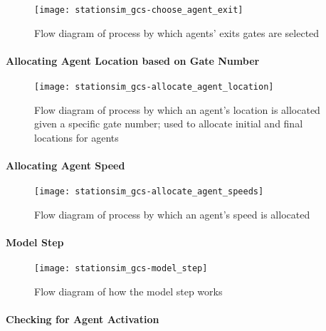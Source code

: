 \begin{figure}[h]
    \centering
    \texttt{[image: stationsim\_gcs-choose\_agent\_exit]}
    \caption{Flow diagram of process by which agents' exits gates are
    selected}\label{fig:flow:agent_exit}
\end{figure}

\paragraph{Allocating Agent Location based on Gate
Number}\label{para:submodels:location_allocation}

\begin{figure}[h]
    \centering
    \texttt{[image: stationsim\_gcs-allocate\_agent\_location]}
    \caption{Flow diagram of process by which an agent's location is allocated
    given a specific gate number; used to allocate initial and final locations
    for agents}\label{fig:flow:allocate_agent_location}
\end{figure}

\paragraph{Allocating Agent Speed}\label{para:submodels:agent_speed}

\begin{figure}[h]
    \centering
    \texttt{[image: stationsim\_gcs-allocate\_agent\_speeds]}
    \caption{Flow diagram of process by which an agent's speed is
    allocated}\label{fig:flow:allocate_agent_speed}
\end{figure}

\paragraph{Model Step}\label{para:submodels:model_step}

\begin{figure}[h]
    \centering
    \texttt{[image: stationsim\_gcs-model\_step]}
    \caption{Flow diagram of how the model step
    works}\label{fig:flow:model_step}
\end{figure}

\paragraph{Checking for Agent Activation}\label{para:submodels:agent_activation}

